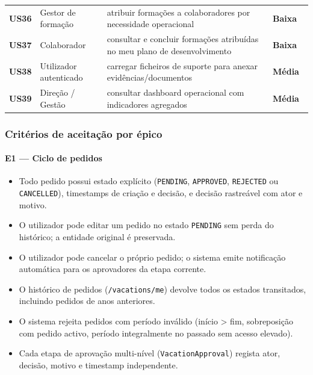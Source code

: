 \documentclass[11pt,a4paper,twoside]{article}
\newcommand{\tagmed} {{\setlength{\fboxsep}{1.5pt}\colorbox{TAGMED} {\scriptsize\sffamily\bfseries\color{white}~Média~}}}
\newcommand{\taglo}  {{\setlength{\fboxsep}{1.5pt}\colorbox{TAGLO}  {\scriptsize\sffamily\bfseries\color{white}~Baixa~}}}
\begin{document}
\begin{longtable}{>{\small\centering\arraybackslash\bfseries}p{1.0cm} >{\small}p{4.4cm} >{\small}p{6.8cm} >{\small\centering\arraybackslash}p{1.4cm}}
US36 & Gestor de formação & atribuir formações a colaboradores por necessidade operacional & \taglo \\
US37 & Colaborador & consultar e concluir formações atribuídas no meu plano de desenvolvimento & \taglo \\
US38 & Utilizador autenticado & carregar ficheiros de suporte para anexar evidências/documentos & \tagmed \\
US39 & Direção / Gestão & consultar dashboard operacional com indicadores agregados & \tagmed \\
\bottomrule
\end{longtable}

\subsubsection{Critérios de aceitação por épico}

\paragraph{E1 — Ciclo de pedidos}
\begin{itemize}
  \item Todo pedido possui estado explícito (\texttt{PENDING}, \texttt{APPROVED}, \texttt{REJECTED} ou \texttt{CANCELLED}), timestamps de criação e decisão, e decisão rastreável com ator e motivo.
  \item O utilizador pode editar um pedido no estado \texttt{PENDING} sem perda do histórico; a entidade original é preservada.
  \item O utilizador pode cancelar o próprio pedido; o sistema emite notificação automática para os aprovadores da etapa corrente.
  \item O histórico de pedidos (\texttt{/vacations/me}) devolve todos os estados transitados, incluindo pedidos de anos anteriores.
  \item O sistema rejeita pedidos com período inválido (início > fim, sobreposição com pedido activo, período integralmente no passado sem acesso elevado).
  \item Cada etapa de aprovação multi-nível (\texttt{VacationApproval}) regista ator, decisão, motivo e timestamp independente.
\end{itemize}
\end{document}
